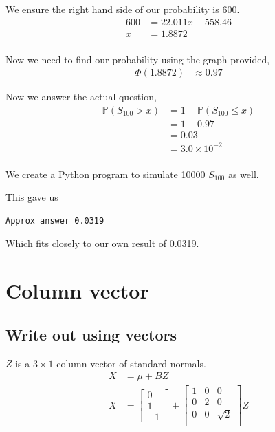 \documentclass{article}
\newcommand{\prob}{\mathbb{P}}
\begin{document}
We ensure the right hand side of our probability is 600.
\begin{align*}
    600 &= 22.011 x + 558.46 \\
    x &= 1.8872 \\
\end{align*}

Now we need to find our probability using the graph provided,
\begin{align*}
    \Phi(1.8872) &\approx 0.97
\end{align*}

Now we answer the actual question,
\begin{align*}
    \prob(S_{100} > x) &= 1 - \prob(S_{100} \leq x) \\
    &= 1 - 0.97 \\
    &= 0.03 \\
    &= 3.0 \times 10^{-2} \\
\end{align*}

We create a Python program to simulate 10000 $S_{100}$ as well.


This gave us
\begin{verbatim}
Approx answer 0.0319
\end{verbatim}

Which fits closely to our own result of 0.0319.

\section{Column vector}
\subsection{Write out using vectors}
$Z$ is a $3\times1$ column vector of standard normals.
\begin{align*}
    X &= \mu + BZ \\
    X
    &=
    \begin{bmatrix}
        0 \\ 1 \\ -1
    \end{bmatrix}
    +
    \begin{bmatrix}
        1 & 0 & 0 \\
        0 & 2 & 0 \\
        0 & 0 & \sqrt{2} \\
    \end{bmatrix}
    Z \\
\end{align*}
\end{document}
